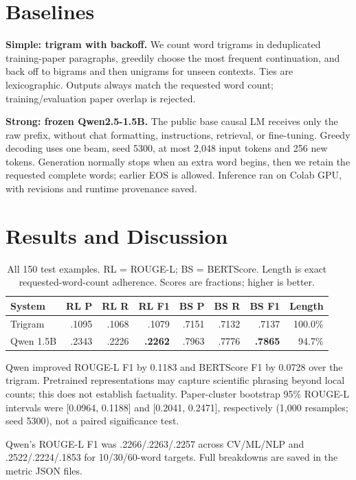 \documentclass[11pt]{article}
\begin{document}
\section*{Baselines}
\textbf{Simple: trigram with backoff.} We count word trigrams in deduplicated training-paper paragraphs, greedily choose the most frequent continuation, and back off to bigrams and then unigrams for unseen contexts. Ties are lexicographic. Outputs always match the requested word count; training/evaluation paper overlap is rejected.

\textbf{Strong: frozen Qwen2.5-1.5B.} The public base causal LM \cite{qwen} receives only the raw prefix, without chat formatting, instructions, retrieval, or fine-tuning. Greedy decoding uses one beam, seed 5300, at most 2,048 input tokens and 256 new tokens. Generation normally stops when an extra word begins, then we retain the requested complete words; earlier EOS is allowed. Inference ran on Colab GPU, with revisions and runtime provenance saved.

\section*{Results and Discussion}
\begin{table}[ht]
\centering\small
\setlength{\tabcolsep}{5pt}
\begin{tabular}{lrrrrrrr}
\toprule
System & RL P & RL R & RL F1 & BS P & BS R & BS F1 & Length \\
\midrule
Trigram & .1095 & .1068 & .1079 & .7151 & .7132 & .7137 & 100.0\% \\
Qwen 1.5B & .2343 & .2226 & \textbf{.2262} & .7963 & .7776 & \textbf{.7865} & 94.7\% \\
\bottomrule
\end{tabular}
\caption{All 150 test examples. RL = ROUGE-L; BS = BERTScore. Length is exact requested-word-count adherence. Scores are fractions; higher is better.}
\end{table}

Qwen improved ROUGE-L F1 by 0.1183 and BERTScore F1 by 0.0728 over the trigram. Pretrained representations may capture scientific phrasing beyond local counts; this does not establish factuality. Paper-cluster bootstrap 95\% ROUGE-L intervals were [0.0964, 0.1188] and [0.2041, 0.2471], respectively (1,000 resamples; seed 5300), not a paired significance test.

Qwen's ROUGE-L F1 was .2266/.2263/.2257 across CV/ML/NLP and .2522/.2224/.1853 for 10/30/60-word targets. Full breakdowns are saved in the metric JSON files.
\end{document}
